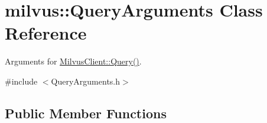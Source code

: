 \hypertarget{classmilvus_1_1_query_arguments}{}\section{milvus\+:\+:Query\+Arguments Class Reference}
\label{classmilvus_1_1_query_arguments}


Arguments for \hyperlink{classmilvus_1_1_milvus_client_a2c27e3b681313329ccf491867d717182}{Milvus\+Client\+::\+Query()}.  




{\ttfamily \#include $<$Query\+Arguments.\+h$>$}

\subsection*{Public Member Functions}
